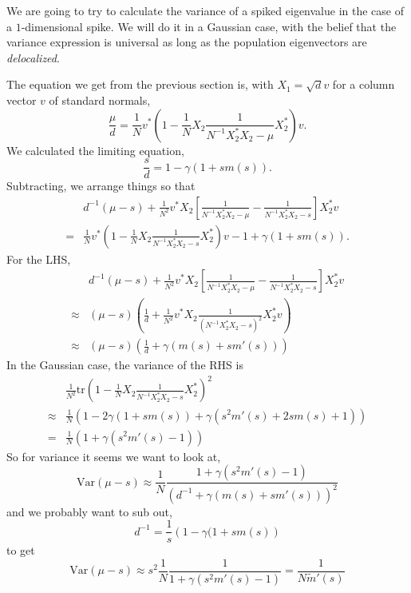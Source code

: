 \documentclass[11 pt, reqno]{article}
\def\beq{\begin{equation}}
\def\eeq{\end{equation}}
\def\tr{\mathrm{tr}}
\begin{document}
We are going to try to calculate the variance of a spiked eigenvalue in the case of a $1$-dimensional spike.  We will do it in a Gaussian case, with the belief that the variance expression is universal as long as the population eigenvectors are \emph{delocalized}.  

The equation we get from the previous section is, with $X_1 = \sqrt{d} v$ for a column vector $v$ of standard normals,
\beq
\frac{\mu}{d} = \frac{1}{N} v^* \left( 1 - \frac{1}{N} X_2 \frac{1}{ N^{-1} X_2^* X_2 - \mu } X_2^* \right) v.
\eeq
We calculated the limiting equation,
\beq
\frac{s}{d}  = 1 - \gamma(1 + s m (s) ).
\eeq
Subtracting, we arrange things so that
\begin{align}
& d^{-1} ( \mu - s ) + \frac{1}{N^2} v^* X_2 \left[ \frac{1}{ N^{-1} X_2^* X_2 - \mu } - \frac{1}{ N^{-1} X_2^* X_2 - s } \right] X_2^* v \\
=& \frac{1}{N} v^* \left( 1 - \frac{1}{N} X_2 \frac{1}{ N^{-1} X_2^* X_2 - s } X_2^* \right) v - 1 +\gamma ( 1 + s m (s) ).
\end{align}
For the LHS,
\begin{align}
&d^{-1} ( \mu - s ) + \frac{1}{N^2} v^* X_2 \left[ \frac{1}{ N^{-1} X_2^* X_2 - \mu } - \frac{1}{ N^{-1} X_2^* X_2 - s } \right] X_2^* v \\
\approx & ( \mu - s) \left( \frac{1}{d} + \frac{1}{N^2} v^* X_2 \frac{1}{ ( N^{-1} X_2^* X_2 - s )^2 } X_2^* v \right) \\
\approx & ( \mu - s ) \left( \frac{1}{d} + \gamma ( m ( s ) + s m' (s) ) \right)
\end{align}
In the Gaussian case, the variance of the RHS is
\begin{align}
& \frac{1}{N^2} \tr  \left( 1 - \frac{1}{N} X_2 \frac{1}{ N^{-1} X_2^* X_2 - s } X_2^* \right)^2 \\
\approx & \frac{1}{N} \left( 1 - 2\gamma(1 + s m (s) ) + \gamma ( s^2 m' (s) + 2 s m (s) + 1 ) \right) \\
= & \frac{1}{N} \left( 1+ \gamma(s^2 m' (s) -1) \right)
\end{align}
So for variance it seems we want to look at,
\beq
\mathrm{Var} (\mu - s) \approx \frac{1}{N} \frac{ 1 + \gamma (s^2 m' (s) - 1) }{ ( d^{-1} + \gamma (m(s) + s m' (s) ) )^2 }
\eeq
and we probably want to sub out,
\beq
d^{-1}  =\frac{1}{s} \left( 1 - \gamma (1 + s m (s) \right)
\eeq
to get
\beq
\mathrm{Var} ( \mu - s) \approx s^2 \frac{1}{N} \frac{1}{ 1 + \gamma (s^2 m'(s) -1 )} = \frac{1}{N \tilde{m}' (s) }
\eeq
\end{document}
